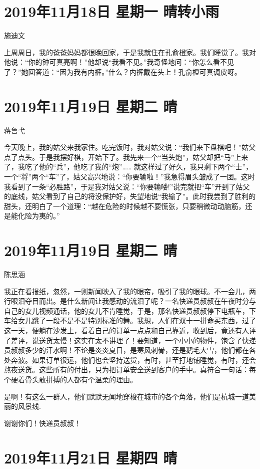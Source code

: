 \section{2019年11月18日 星期一 晴转小雨}

施迪文

上周周日，我的爸爸妈妈都很晚回家，于是我就住在孔俞橙家。我们睡觉了。我对他说：“你的钟可真亮啊！”他却说“我看不见。”我奇怪地问：“你怎么看不见了？”她回答道：“因为我有内裤。”什么？内裤戴在头上！孔俞橙可真调皮呀。

\section{2019年11月19日 星期二 晴}

蒋鲁弋

今天晚上，我的姑父来我家住。吃完饭时，我对姑父说：“我们来下盘棋吧！”姑父点了点头。于是我摆好棋，开始下了。我先来一个“当头炮”，姑父却把“马”上来了，我吃了他的“兵”，他吃了我的“炮”…… 就这样过了好久，我只剩下两个“士”，一个“将”两个“车”了，姑父高兴地说：“你要输啦！”我急得眉头皱成了一团。这时我看到了一条“必胜路”，于是我对姑父说：“你要输喽!”说完就把“车”开到了姑父的底线，姑父看到了自己的将没保护好，失望地说“我输了”。此时我尝到了胜利的甜头，还明白了一个道理：“越在危险的时候越不要慌张，只要稍微动动脑筋，还是能化险为夷的。”

\section{2019年11月19日 星期二 晴}

陈思涵

我正在看报纸，忽然，一则新闻映入了我的眼帘，吸引了我的眼球。不一会儿，两行眼泪夺目而出。是什么新闻让我感动的流泪了呢？一名快递员叔叔在午夜时分与自己的女儿视频通话，他的女儿不肯睡觉，于是，那名快递员叔叔停下电瓶车，下车给女儿跳了一段不是不是特别标准的舞。我想，人们在双十一拼命买东西，过了这一天，便躺在沙发上，看着自己的订单一点点和自己靠近，收到后，竟还有人评了差评，说送货太慢！这实在太不讲理了！要知道，一个小小的物件，饱含了快递员叔叔多少的汗水啊！不论是炎炎夏日，是寒风刺骨，还是鹅毛大雪，他们都在各处奔波。如果订单很远，他们也会坚持送货，有时，甚至打地铺睡觉，有时，还会熬夜送货。这些所有的付出，只为把订单安全送到客户的手中。真符合一句话：每个硬着骨头敢拼搏的人都有个温柔的理由。

是啊！有这么一群人，他们默默无闻地穿梭在城市的各个角落，他们是杭城一道美丽的风景线.

谢谢你们！快递员叔叔！

\section{2019年11月21日 星期四 晴}

